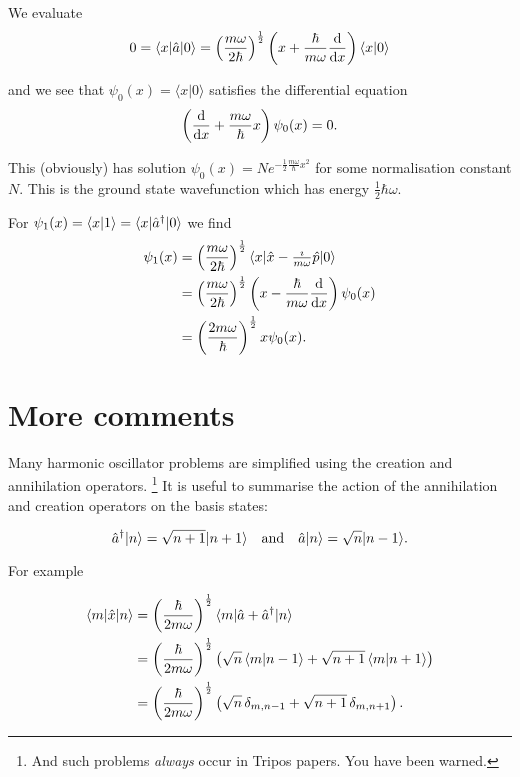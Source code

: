 \documentclass{notes}
\newcommand{\bra}[1]{\langle#1|}
\newcommand{\ket}[1]{|#1\rangle}
\newcommand{\scp}[2]{\langle#1|#2\rangle}
\begin{document}
We evaluate
\[
0 = \bra{x} \Hat{a} \ket{0} = \left( \frac{m \omega}{2 \hbar}
\right)^{\frac{1}{2}} \left( x + \frac{\hbar}{m \omega}
\diff{}{x} \right) \scp{x}{0}
\]

and we see that $\psi_0(x) = \scp{x}{0}$ satisfies the differential equation
\[
\left(\frac{\mathrm{d}}{\mathrm{d} x} + \frac{m \omega}{\hbar} x \right) \psi_0(x) = 0.
\]

This (obviously) has solution $\psi_0(x) = N e^{- \frac{1}{2}
\frac{m \omega}{\hbar} x^2}$ for some normalisation constant $N$.  This is
the ground state wavefunction which has energy $\frac{1}{2} \hbar \omega$.

For $\psi_1(x) = \scp{x}{1} = \bra{x} \Hat{a}^\dag \ket{0}$ we find
\begin{align*}
\psi_1(x) &= \left( \frac{m \omega}{2 \hbar} \right)^{\frac{1}{2}}
\bra{x} \Hat{x} - \tfrac{\imath}{m \omega}\Hat{p} \ket{0} \\
&= \left( \frac{m \omega}{2 \hbar} \right)^{\frac{1}{2}}
\left( x - \frac{\hbar}{m \omega} \diff{}{x} \right) \psi_0(x) \\
&= \left( \frac{2 m \omega}{\hbar} \right)^{\frac{1}{2}} x \psi_0(x).
\end{align*}

\section{More comments}

Many harmonic oscillator problems are simplified using the creation
and annihilation operators.%
\footnote{And such problems \emph{always} occur in Tripos papers.  You
  have been warned.}  It is useful to summarise the action of the
annihilation and creation operators on the basis states:

\[
\Hat{a}^\dag \ket{n} = \sqrt{n+1} \ket{n+1} \quad \text{and} \quad
\Hat{a} \ket{n} = \sqrt{n} \ket{n-1}.
\]

For example

\begin{align*}
\bra{m} \Hat{x} \ket{n} &=
\left( \frac{\hbar}{2 m \omega} \right)^{\frac{1}{2}}
\bra{m} \Hat{a} + \Hat{a}^\dag \ket{n} \\
&= \left( \frac{\hbar}{2 m \omega} \right)^{\frac{1}{2}}
\left( \sqrt{n}\, \scp{m}{n-1} + \sqrt{n+1}\, \scp{m}{n+1} \right)\\
& = \left( \frac{\hbar}{2 m \omega} \right)^{\frac{1}{2}}
\left( \sqrt{n}\, \delta_{m,n-1} + \sqrt{n+1}\, \delta_{m,n+1} \right).
\end{align*}
\end{document}

